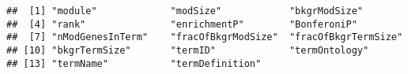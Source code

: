 \documentclass[]{article}
\newenvironment{Shaded}{\begin{snugshade}}{\end{snugshade}}
\newcommand{\CommentTok}[1]{\textcolor[rgb]{0.56,0.35,0.01}{\textit{#1}}}
\newcommand{\DecValTok}[1]{\textcolor[rgb]{0.00,0.00,0.81}{#1}}
\newcommand{\KeywordTok}[1]{\textcolor[rgb]{0.13,0.29,0.53}{\textbf{#1}}}
\newcommand{\NormalTok}[1]{#1}
\newcommand{\OperatorTok}[1]{\textcolor[rgb]{0.81,0.36,0.00}{\textbf{#1}}}
\newcommand{\StringTok}[1]{\textcolor[rgb]{0.31,0.60,0.02}{#1}}
\begin{document}
\begin{Shaded}
\end{Shaded}

\begin{verbatim}
##  [1] "module"             "modSize"            "bkgrModSize"       
##  [4] "rank"               "enrichmentP"        "BonferoniP"        
##  [7] "nModGenesInTerm"    "fracOfBkgrModSize"  "fracOfBkgrTermSize"
## [10] "bkgrTermSize"       "termID"             "termOntology"      
## [13] "termName"           "termDefinition"
\end{verbatim}
\end{document}
